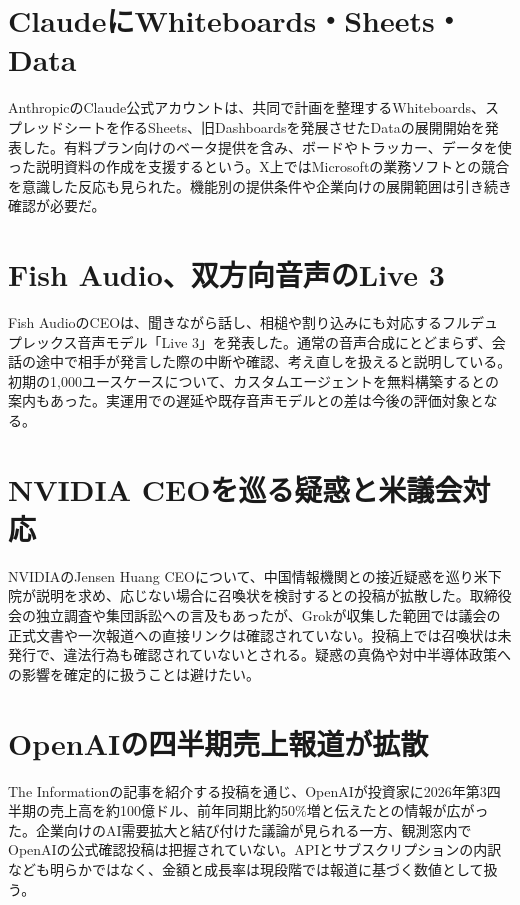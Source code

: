 \section{ClaudeにWhiteboards・Sheets・Data}
AnthropicのClaude公式アカウントは、共同で計画を整理するWhiteboards、スプレッドシートを作るSheets、旧Dashboardsを発展させたDataの展開開始を発表した。有料プラン向けのベータ提供を含み、ボードやトラッカー、データを使った説明資料の作成を支援するという。X上ではMicrosoftの業務ソフトとの競合を意識した反応も見られた。機能別の提供条件や企業向けの展開範囲は引き続き確認が必要だ。

\section{Fish Audio、双方向音声のLive 3}
Fish AudioのCEOは、聞きながら話し、相槌や割り込みにも対応するフルデュプレックス音声モデル「Live 3」を発表した。通常の音声合成にとどまらず、会話の途中で相手が発言した際の中断や確認、考え直しを扱えると説明している。初期の1,000ユースケースについて、カスタムエージェントを無料構築するとの案内もあった。実運用での遅延や既存音声モデルとの差は今後の評価対象となる。

\section{NVIDIA CEOを巡る疑惑と米議会対応}
NVIDIAのJensen Huang CEOについて、中国情報機関との接近疑惑を巡り米下院が説明を求め、応じない場合に召喚状を検討するとの投稿が拡散した。取締役会の独立調査や集団訴訟への言及もあったが、Grokが収集した範囲では議会の正式文書や一次報道への直接リンクは確認されていない。投稿上では召喚状は未発行で、違法行為も確認されていないとされる。疑惑の真偽や対中半導体政策への影響を確定的に扱うことは避けたい。

\section{OpenAIの四半期売上報道が拡散}
The Informationの記事を紹介する投稿を通じ、OpenAIが投資家に2026年第3四半期の売上高を約100億ドル、前年同期比約50\%増と伝えたとの情報が広がった。企業向けのAI需要拡大と結び付けた議論が見られる一方、観測窓内でOpenAIの公式確認投稿は把握されていない。APIとサブスクリプションの内訳なども明らかではなく、金額と成長率は現段階では報道に基づく数値として扱う。

